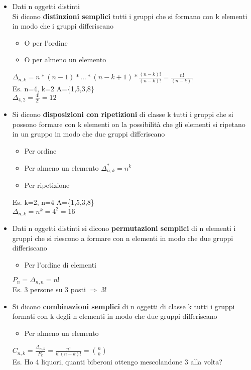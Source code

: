 \documentclass{report}
\begin{document}
\begin{itemize}
  \item Dati n oggetti distinti\\Si dicono \textbf{distinzioni semplici} tutti i gruppi che si formano con k elementi in modo che i gruppi differiscano
  \begin{itemize}
    \item O per l'ordine
    \item O per almeno un elemento
  \end{itemize}
  $\Delta_{n,k} = n*(n-1)*...*(n-k+1)*\frac{(n-k)!}{(n-k)!}=\frac{n!}{(n-k)!}$\\
  Es. n=4, k=2 A=\{1,5,3,8\}\\ $\Delta_{4,2} = \frac{4!}{2!}=12$
  \item Si dicono \textbf{disposizioni con ripetizioni} di classe k tutti i gruppi che si possono formare con k elementi on la possibilità che gli elementi si ripetano in un gruppo in modo che due gruppi differiscano
  \begin{itemize}
    \item Per ordine
    \item Per almeno un elemento  $\Delta_{n,k}^* = n^k$
    \item Per ripetizione
  \end{itemize}
  Es. k=2, n=4 A=\{1,5,3,8\}\\ $\Delta_{n,k} = n^k = 4^2 = 16$
  \item Dati n oggetti distinti si dicono \textbf{permutazioni semplici} di n elementi i gruppi che si riescono a formare con n elementi in modo che due gruppi differiscano
  \begin{itemize}
    \item Per l'ordine di elementi
    \end{itemize}
$P_n=\Delta_{n,n} = n!$\\
Es. 3 persone su 3 posti $\Rightarrow$ 3!
    \item Si dicono \textbf{combinazioni semplici} di n oggetti di classe k tutti i gruppi formati con k degli n elementi in modo che due gruppi differiscano
    \begin{itemize}
      \item Per almeno un elemento
    \end{itemize}
    $C_{n,k} = \frac{\Delta_{n,k}}{P_k} = \frac{n!}{k!(n-k)!}=\binom{n}{k}$\\
    Es. Ho 4 liquori, quanti biberoni ottengo mescolandone 3 alla volta?\\

\end{itemize}
\end{document}
